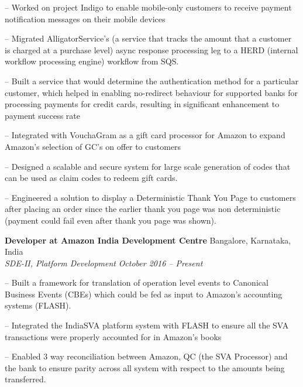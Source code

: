 \documentclass[margin,line]{resume}
\begin{document}
\begin{resume}
     \begin{compactitem}
        \item[--] Worked on project Indigo to enable mobile-only customers to receive payment notification messages on their mobile devices
        \item[--] Migrated AlligatorService's (a service that tracks the amount that a customer is charged at a purchase level) async response processing leg to a HERD (internal workflow processing engine) workflow from SQS.
        \item[--] Built a service that would determine the authentication method for a particular customer, which helped in enabling no-redirect behaviour for supported banks for processing payments for credit cards, resulting in significant enhancement to payment success rate
        \item[--] Integrated with VouchaGram as a gift card processor for Amazon to expand Amazon's selection of GC's on offer to customers
        \item[--] Designed a scalable and secure system for large scale generation of codes that can be used as claim codes to redeem gift cards.
        \item[--] Engineered a solution to display a Deterministic Thank You Page to customers after placing an order since the earlier thank you page was non deterministic (payment could fail even after thank you page was shown).
    \end{compactitem}
    
    \vspace{2mm}
    
     \textbf{Developer at Amazon India Development Centre} \hfill Bangalore, Karnataka, India
	 \\
     \textit{SDE-II, Platform Development} \hfill \textit{October 2016 -- Present}

     \begin{compactitem}
        \item[--] Built a framework for translation of operation level events to Canonical Business Events (CBEs) which could be fed as input to Amazon's accounting systems (FLASH).
        \item[--] Integrated the IndiaSVA platform system with FLASH to ensure all the SVA transactions were properly accounted for in Amazon's books
        \item[--] Enabled 3 way reconciliation between Amazon, QC (the SVA Processor) and the bank to ensure parity across all system with respect to the amounts being transferred.
    \end{compactitem}
    

\end{resume}
\end{document}
